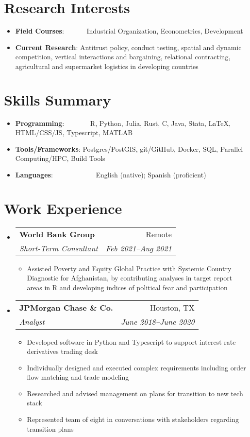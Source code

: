 \documentclass[a4paper,20pt]{article}
\makeatletter
\newcommand{\resumeItem}[2]{
  \item\small{
    \textbf{#1}{: #2 \vspace{-2pt}}
  }
}
\newcommand{\resumeSubheading}[4]{
  \vspace{-1pt}\item
    \begin{tabular*}{0.97\textwidth}{l@{\extracolsep{\fill}}r}
      \textbf{#1} & #2 \\
      \textit{#3} & \textit{#4} \\
    \end{tabular*}\vspace{-5pt}
}
\newcommand{\resumeSubItem}[2]{\resumeItem{#1}{#2}\vspace{-3pt}}
\newcommand{\resumeSubHeadingListStart}{\begin{itemize}[leftmargin=*]}
\newcommand{\resumeSubHeadingListEnd}{\end{itemize}}
\newcommand{\resumeItemListStart}{\begin{itemize}}
\newcommand{\resumeItemListEnd}{\end{itemize}\vspace{-5pt}}
\makeatother
\begin{document}
\section{Research Interests}
\begin{itemize}[leftmargin=*, itemindent=-9em]
  \resumeSubItem{Field Courses}{~~~~~~Industrial Organization, Econometrics, Development}
  \resumeSubItem{Current Research}{Antitrust policy, conduct testing, spatial and dynamic competition, vertical interactions and bargaining, relational contracting, agricultural and supermarket logistics in developing countries}
  \resumeSubHeadingListEnd
	    
\vspace{-5pt}
\section{Skills Summary}
	\resumeSubHeadingListStart
	\resumeSubItem{Programming}{~~~~~~~R, Python, Julia, Rust, C, Java, Stata, LaTeX, HTML/CSS/JS, Typescript, MATLAB}
	\resumeSubItem{Tools/Frameworks}{Postgres/PostGIS, git/GitHub, Docker, SQL, Parallel Computing/HPC, Build Tools}
	\resumeSubItem{Languages}{~~~~~~~~~~~~English (native); Spanish (proficient)}

\resumeSubHeadingListEnd
\vspace{-5pt}
\section{Work Experience}
  \resumeSubHeadingListStart
    \resumeSubheading{World Bank Group}{Remote}
    {Short-Term Consultant}{Feb 2021–Aug 2021}
    \resumeItemListStart
        \item Assisted Poverty and Equity Global Practice with Systemic Country Diagnostic for Afghanistan, by contributing analyses in target report areas in R and developing indices of political fear and participation
      \resumeItemListEnd
    \resumeSubheading
		{JPMorgan Chase \& Co.}{Houston, TX}
		{Analyst}{June 2018–June 2020}
		\resumeItemListStart
        \item 
          {Developed software in Python and Typescript to support interest rate derivatives trading desk}
        \item  
          {Individually designed and executed complex requirements including order flow matching and trade modeling}
        \item {Researched and advised management on plans for transition to new tech stack}
        \item Represented team of eight in conversations with stakeholders regarding transition plans
		\resumeItemListEnd


\end{itemize}
\end{document}
